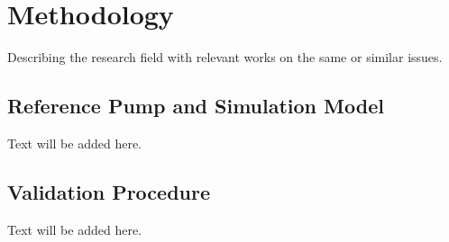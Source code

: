 {\chapter{Methodology}}
\label{sec:related}

Describing the research field with relevant works on the same or similar issues.

\section{Reference Pump and Simulation Model}
Text will be added here.

\section{Validation Procedure}
Text will be added here.

